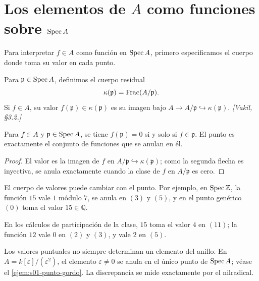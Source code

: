 \section{\texorpdfstring{Los elementos de $A$ como funciones sobre $\operatorname{Spec} A$}{Los elementos de A como funciones sobre Spec A}}

Para interpretar $f\in A$ como función en $\operatorname{Spec} A$, primero especificamos el cuerpo donde toma su valor en cada punto.

\begin{defi}
\label{defi:s01-cuerpo-residual-evaluacion}
Para $\mathfrak p\in\operatorname{Spec} A$, definimos el cuerpo residual
\[
\kappa(\mathfrak p)=\operatorname{Frac}(A/\mathfrak p).
\]
Si $f\in A$, su valor $f(\mathfrak p)\in\kappa(\mathfrak p)$ es su imagen bajo $A\to A/\mathfrak p\hookrightarrow\kappa(\mathfrak p)$. \emph{[Vakil, \S3.2.]}
\end{defi}

\begin{prop}
\label{prop:s01-f-p-tiene-f-p}
Para $f\in A$ y $\mathfrak p\in\operatorname{Spec} A$, se tiene $f(\mathfrak p)=0$ si y solo si $f\in\mathfrak p$. El punto es exactamente el conjunto de funciones que se anulan en él.
\end{prop}
\begin{proof}
El valor es la imagen de $f$ en $A/\mathfrak p\hookrightarrow\kappa(\mathfrak p)$; como la segunda flecha es inyectiva, se anula exactamente cuando la clase de $f$ en $A/\mathfrak p$ es cero.
\end{proof}

El cuerpo de valores puede cambiar con el punto. Por ejemplo, en $\operatorname{Spec}\mathbb Z$, la función $15$ vale $1$ módulo $7$, se anula en $(3)$ y $(5)$, y en el punto genérico $(0)$ toma el valor $15\in\mathbb Q$.

En los cálculos de participación de la clase, $15$ toma el valor $4$ en $(11)$; la función $12$ vale $0$ en $(2)$ y $(3)$, y vale $2$ en $(5)$.

\begin{nota}
Los valores puntuales no siempre determinan un elemento del anillo. En $A=k[\varepsilon]/(\varepsilon^2)$, el elemento $\varepsilon\ne0$ se anula en el único punto de $\operatorname{Spec} A$; véase el \cref{ejem:s01-punto-gordo}. La discrepancia se mide exactamente por el nilradical.
\end{nota}

